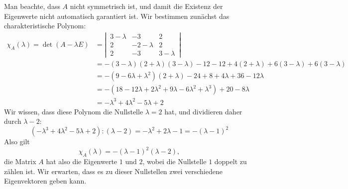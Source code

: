 \begin{loesung}
Man beachte, dass $A$ nicht symmetrisch ist, und damit die Existenz der
Eigenwerte nicht automatisch garantiert ist.
Wir bestimmen zunächst das charakteristische Polynom:
\begin{align*}
\chi_A(\lambda)=
\det (A-\lambda E)
&=
\left|\,
\begin{matrix}
3-\lambda&-3&2\\
2&-2-\lambda&2\\
2&-3&3-\lambda
\end{matrix}
\,\right|
\\
&=-(3-\lambda)(2+\lambda)(3-\lambda) -12-12
+4(2+\lambda)+6(3-\lambda)+6(3-\lambda)
\\
&=
-(9-6\lambda+\lambda^2)(2+\lambda)-24 +8+4\lambda +36-12\lambda
\\
&=
-(18-12\lambda+2\lambda^2+9\lambda -6\lambda^2+\lambda^3)+20-8\lambda
\\
&=
-\lambda^3+4\lambda^2-5\lambda+2
\end{align*}
Wir wissen, dass diese Polynom die Nullstelle $\lambda=2$ hat, und
dividieren daher durch $\lambda -2$:
\[
(-\lambda^3+4\lambda^2-5\lambda+2):(\lambda -2)=-\lambda^2+2\lambda-1
=-(\lambda -1)^2
\]
Also gilt
\[
\chi_A(\lambda)=-(\lambda -1)^2(\lambda -2),
\]
die Matrix $A$ hat also die Eigenwerte $1$ und $2$, wobei die Nullstelle
$1$ doppelt zu zählen ist. Wir erwarten, dass es zu dieser Nullstellen
zwei verschiedene Eigenvektoren geben kann.


\end{loesung}
